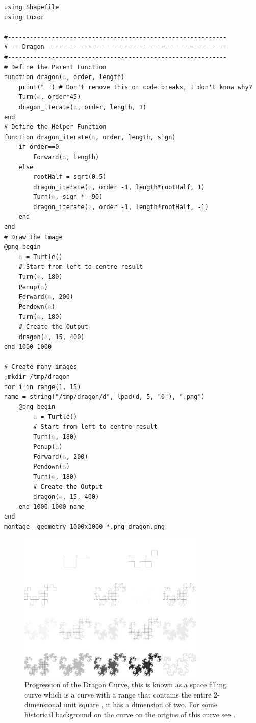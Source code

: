 \documentclass[a4paper,11pt,twoside]{article}
\begin{document}
\begin{listing}[htbp]
\begin{verbatim}
using Shapefile
using Luxor

#------------------------------------------------------------
#--- Dragon -------------------------------------------------
#------------------------------------------------------------
# Define the Parent Function
function dragon(♘, order, length)
    print(" ") # Don't remove this or code breaks, I don't know why?
    Turn(♘, order*45)
    dragon_iterate(♘, order, length, 1)
end
# Define the Helper Function
function dragon_iterate(♘, order, length, sign)
    if order==0
        Forward(♘, length)
    else
        rootHalf = sqrt(0.5)
        dragon_iterate(♘, order -1, length*rootHalf, 1)
        Turn(♘, sign * -90)
        dragon_iterate(♘, order -1, length*rootHalf, -1)
    end
end
# Draw the Image
@png begin
    ♘ = Turtle()
    # Start from left to centre result
    Turn(♘, 180)
    Penup(♘)
    Forward(♘, 200)
    Pendown(♘)
    Turn(♘, 180)
    # Create the Output
    dragon(♘, 15, 400)
end 1000 1000

# Create many images
;mkdir /tmp/dragon
for i in range(1, 15)
name = string("/tmp/dragon/d", lpad(d, 5, "0"), ".png")
    @png begin
        ♘ = Turtle()
        # Start from left to centre result
        Turn(♘, 180)
        Penup(♘)
        Forward(♘, 200)
        Pendown(♘)
        Turn(♘, 180)
        # Create the Output
        dragon(♘, 15, 400)
    end 1000 1000 name
end
montage -geometry 1000x1000 *.png dragon.png

\end{verbatim}
\caption{\label{turtle-dragon}\emph{Julia} code to produce the Dragon Curve shown in figure \ref{fig:turtle-dragon}}
\end{listing}



\begin{figure}[htbp]
\centering
\includegraphics[width=9cm]{../Problems/Chaos/Spirals/dragon.png}
\caption{\label{fig:turtle-dragon}Progression of the Dragon Curve, this is known as a space filling curve \cite[p. 350]{peitgenChaosFractalsNew2004} which is a curve with a range that contains the entire 2-dimensional unit square \cite{ventrellaSpaceFillingCurvesAre2014}, it has a dimension of two. For some historical background on the curve on the origins of this curve see \cite{tabachnikovDragonCurvesRevisited2014}.}
\end{figure}
\end{document}
